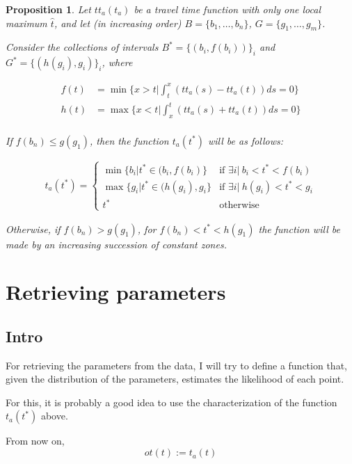\documentclass{article}
\newtheorem{prop}{Proposition}
\begin{document}
\begin{prop}
  Let \(tt_a(t_a)\) be a travel time function with only one local maximum \(\hat{t}\),
  and let (in increasing order) \(B = \{b_1, \dots, b_n\}\), \(G = \{g_1, \dots, g_m\}\).


  Consider the collections of intervals \(B^* = \{(b_i, f(b_i))\}_i\) and \(G^* = \{(h(g_i), g_i)\}_i\), where
  
  \begin{align*}
    f(t) & = \min\{x>t | \int_t^x(tt_a(s) - tt_a(t)) ds = 0\} \\
    h(t) & = \max\{x<t | \int_x^t(tt_a(s) + tt_a(t)) ds = 0\} \\
  \end{align*}

  If \(f(b_n) \leq g(g_1)\), then the function \(t_a(t^*)\) will be as follows:

  \begin{align*}
    t_a(t^*) = 
    \begin{cases}
      \min \{b_i | t^* \in (b_i, f(b_i)\} & \text{if } \exists i |\ b_i < t^* < f(b_i) \\
      \max \{g_i | t^* \in (h(g_i), g_i\} & \text{if } \exists i |\ h(g_i) < t^* < g_i \\
      t^* & \text{otherwise}
    \end{cases}
  \end{align*}

  Otherwise, if \(f(b_n) > g(g_1)\), for \(f(b_n) < t^* < h(g_1)\) the function will be made by an increasing succession of constant zones.
\end{prop}

\section{Retrieving parameters}

\subsection{Intro}

For retrieving the parameters from the data, I will try to define a function that,
given the distribution of the parameters, estimates the likelihood of each point.

For this, it is probably a good idea to use the characterization of the function \(t_a(t^*)\) above.

From now on,
\begin{equation*}
  ot(t) := t_a(t)
\end{equation*}
\end{document}
